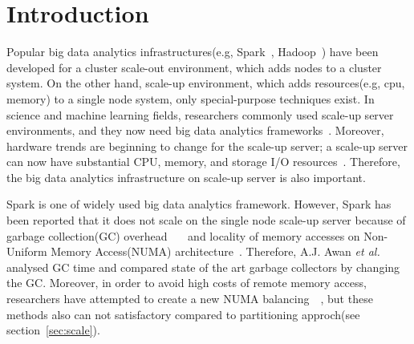 \section{Introduction} \label{sec:introduction}
Popular big data analytics infrastructures(e.g, Spark~\cite{Zaharia2012RDD},
Hadoop~\cite{Shvachko2010HDF}) have been developed for a cluster scale-out
environment, which adds nodes to a cluster system.
On the other hand, scale-up environment, which adds resources(e.g, cpu, memory)
to a single node system, only special-purpose techniques exist.
In science and machine learning fields, researchers
commonly used scale-up server environments, and they now need big data analytics
frameworks~\cite{Chaimov2016SSH}.
Moreover, hardware trends are beginning to change for the scale-up
server; a scale-up server can now have substantial CPU, memory,
and storage I/O resources~\cite{Appuswamy2013SVS}.
Therefore, the big data analytics infrastructure on scale-up server is
also important.

Spark is one of widely used big data analytics framework.
However, Spark has been reported that it does
not scale on the single node scale-up server because of garbage
collection(GC)
overhead~\cite{Ahsan2016SVS}~\cite{Ousterhout2015MSP}~\cite{Maas2016THL} and
locality of memory accesses on Non-Uniform Memory Access(NUMA)
architecture~\cite{Cao2016ADS}.
Therefore, A.J. Awan \textit{et al.} analysed GC time and compared state of the art
garbage collectors by changing the GC.
Moreover, in order to avoid high costs of remote memory access, researchers have
attempted to create a new NUMA balancing~\cite{Dashti2013TMH}~\cite{AutoNUMA}, but
these methods also can not satisfactory compared to partitioning approch(see section~\ref{sec:scale}).


